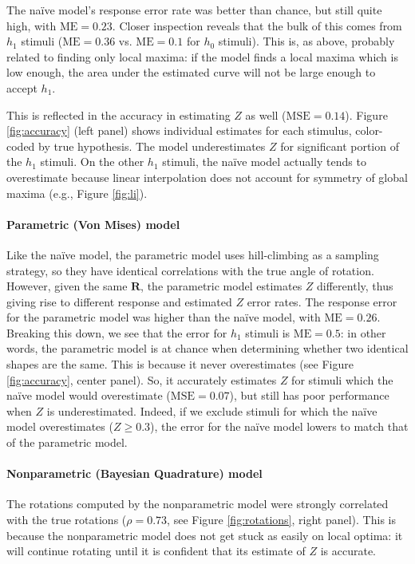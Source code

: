 \documentclass{article} %
\newcommand{\MSE}[0]{\mathrm{MSE}}
\newcommand{\ME}[0]{\mathrm{ME}}
\newcommand{\naive}[0]{na\"ive}
\begin{document}
The \naive{} model's response error rate was better than chance, but
still quite high, with $\ME{}=0.23$. Closer inspection reveals that
the bulk of this comes from $h_1$ stimuli ($\ME{}=0.36$
vs. $\ME{}=0.1$ for $h_0$ stimuli). This is, as above, probably
related to finding only local maxima: if the model finds a local
maxima which is low enough, the area under the estimated curve will
not be large enough to accept $h_1$.

This is reflected in the accuracy in estimating $Z$ as well
($\MSE{}=0.14$). Figure \ref{fig:accuracy} (left panel) shows
individual estimates for each stimulus, color-coded by true
hypothesis. The model underestimates $Z$ for significant portion of
the $h_1$ stimuli. On the other $h_1$ stimuli, the \naive{} model
actually tends to overestimate because linear interpolation does not
account for symmetry of global maxima (e.g., Figure \ref{fig:li}).

\paragraph{Parametric (Von Mises) model}

Like the \naive{} model, the parametric model uses hill-climbing as a
sampling strategy, so they have identical correlations with the true
angle of rotation. However, given the same $\mathbf{R}$, the
parametric model estimates $Z$ differently, thus giving rise to
different response and estimated $Z$ error rates. The response error
for the parametric model was higher than the \naive{} model, with
$\ME{}=0.26$. Breaking this down, we see that the error for $h_1$
stimuli is $\ME{}=0.5$: in other words, the parametric model is at
chance when determining whether two identical shapes are the
same. This is because it never overestimates (see Figure
\ref{fig:accuracy}, center panel). So, it accurately estimates $Z$ for
stimuli which the \naive{} model would overestimate ($\MSE{}=0.07$),
but still has poor performance when $Z$ is underestimated. Indeed, if
we exclude stimuli for which the \naive{} model overestimates ($Z\geq
0.3$), the error for the \naive{} model lowers to match that of the
parametric model.

\paragraph{Nonparametric (Bayesian Quadrature) model}

The rotations computed by the nonparametric model were strongly
correlated with the true rotations ($\rho=0.73$, see Figure
\ref{fig:rotations}, right panel). This is because the nonparametric
model does not get stuck as easily on local optima: it will continue
rotating until it is confident that its estimate of $Z$ is accurate. 
\end{document}
